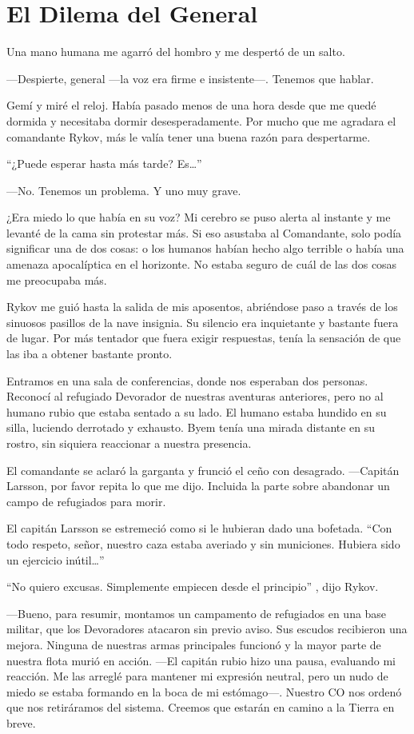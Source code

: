 \chapter{El Dilema del General}\label{sec:el-dilema-del-general}

Una mano humana me agarró del hombro y me despertó de un salto.

—Despierte, general —la voz era firme e insistente—. Tenemos que hablar.

Gemí y miré el reloj. Había pasado menos de una hora desde que me quedé dormida y necesitaba dormir desesperadamente. Por mucho que me agradara el comandante Rykov, más le valía tener una buena razón para despertarme.

``¿Puede esperar hasta más tarde? Es…''


—No. Tenemos un problema. Y uno muy grave.

¿Era miedo lo que había en su voz? Mi cerebro se puso alerta al instante y me levanté de la cama sin protestar más. Si eso asustaba al Comandante, solo podía significar una de dos cosas: o los humanos habían hecho algo terrible o había una amenaza apocalíptica en el horizonte. No estaba seguro de cuál de las dos cosas me preocupaba más.

Rykov me guió hasta la salida de mis aposentos, abriéndose paso a través de los sinuosos pasillos de la nave insignia. Su silencio era inquietante y bastante fuera de lugar. Por más tentador que fuera exigir respuestas, tenía la sensación de que las iba a obtener bastante pronto.

Entramos en una sala de conferencias, donde nos esperaban dos personas. Reconocí al refugiado Devorador de nuestras aventuras anteriores, pero no al humano rubio que estaba sentado a su lado. El humano estaba hundido en su silla, luciendo derrotado y exhausto. Byem tenía una mirada distante en su rostro, sin siquiera reaccionar a nuestra presencia.

El comandante se aclaró la garganta y frunció el ceño con desagrado. —Capitán Larsson, por favor repita lo que me dijo. Incluida la parte sobre abandonar un campo de refugiados para morir.

El capitán Larsson se estremeció como si le hubieran dado una bofetada. ``Con todo respeto, señor, nuestro caza estaba averiado y sin municiones. Hubiera sido un ejercicio inútil…''


``No quiero excusas. Simplemente empiecen desde el principio''
, dijo Rykov.

—Bueno, para resumir, montamos un campamento de refugiados en una base militar, que los Devoradores atacaron sin previo aviso. Sus escudos recibieron una mejora. Ninguna de nuestras armas principales funcionó y la mayor parte de nuestra flota murió en acción. —El capitán rubio hizo una pausa, evaluando mi reacción. Me las arreglé para mantener mi expresión neutral, pero un nudo de miedo se estaba formando en la boca de mi estómago—. Nuestro CO nos ordenó que nos retiráramos del sistema. Creemos que estarán en camino a la Tierra en breve.

